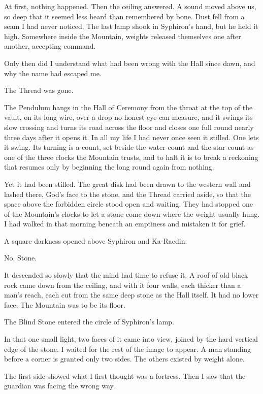 At first, nothing happened.
Then the ceiling answered.
A sound moved above us, so deep that it seemed less heard than remembered by bone.
Dust fell from a seam I had never noticed.
The last lamp shook in Syphiron's hand, but he held it high.
Somewhere inside the Mountain, weights released themselves one after another, accepting command.\par
Only then did I understand what had been wrong with the Hall since dawn, and why the name had escaped me.\par
The Thread was gone.\par
The Pendulum hangs in the Hall of Ceremony from the throat at the top of the vault, on its long wire, over a drop no honest eye can measure, and it swings its slow crossing and turns its road across the floor and closes one full round nearly three days after it opens it. In all my life I had never once seen it stilled. One lets it swing. Its turning is a count, set beside the water-count and the star-count as one of the three clocks the Mountain trusts, and to halt it is to break a reckoning that resumes only by beginning the long round again from nothing.\par
Yet it had been stilled. The great disk had been drawn to the western wall and lashed there, God's face to the stone, and the Thread carried aside, so that the space above the forbidden circle stood open and waiting. They had stopped one of the Mountain's clocks to let a stone come down where the weight usually hung. I had walked in that morning beneath an emptiness and mistaken it for grief.\par
A square darkness opened above Syphiron and Ka-Raedin.\par
No.
Stone.\par
It descended so slowly that the mind had time to refuse it.
A roof of old black rock came down from the ceiling, and with it four walls, each thicker than a man's reach, each cut from the same deep stone as the Hall itself.
It had no lower face.
The Mountain was to be its floor.\par
The Blind Stone entered the circle of Syphiron's lamp.\par
In that one small light, two faces of it came into view, joined by the hard vertical edge of the stone.
I waited for the rest of the image to appear.
A man standing before a corner is granted only two sides.
The others existed by weight alone.\par
The first side showed what I first thought was a fortress.
Then I saw that the guardian was facing the wrong way.
